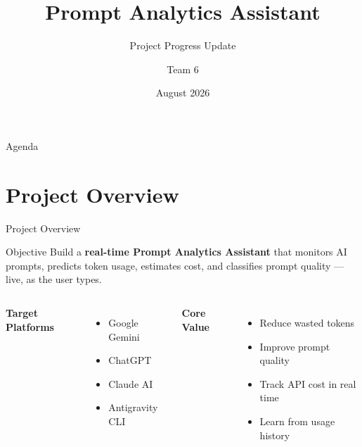 \documentclass[aspectratio=169]{beamer}
\title[Prompt Analytics Assistant]{\textbf{Prompt Analytics Assistant}}
\subtitle{Project Progress Update}
\author{Team 6}
\date{August 2026}
\begin{document}
\begin{frame}
  \titlepage
\end{frame}

\begin{frame}{Agenda}
  \tableofcontents
\end{frame}

\section{Project Overview}
\begin{frame}{Project Overview}
  \begin{block}{Objective}
    Build a \textbf{real-time Prompt Analytics Assistant} that monitors AI prompts,
    predicts token usage, estimates cost, and classifies prompt quality — live, as the user types.
  \end{block}
  \vspace{0.4em}
  \begin{columns}
    \textbf{Target Platforms}
    \begin{itemize}
      \item Google Gemini
      \item ChatGPT
      \item Claude AI
      \item Antigravity CLI
    \end{itemize}
    \textbf{Core Value}
    \begin{itemize}
      \item Reduce wasted tokens
      \item Improve prompt quality
      \item Track API cost in real time
      \item Learn from usage history
    \end{itemize}
  \end{columns}
\end{frame}

\end{document}
